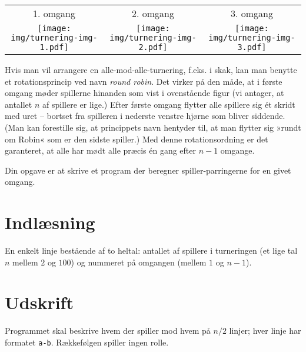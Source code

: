 
\begin{tabular}{ccc}
  1. omgang & 2. omgang & 3. omgang\\[1ex]
  \texttt{[image: img/turnering-img-1.pdf]} &
  \texttt{[image: img/turnering-img-2.pdf]} &
  \texttt{[image: img/turnering-img-3.pdf]} 
\end{tabular}
\bigskip

Hvis man vil arrangere en alle-mod-alle-turnering, f.eks. i skak, kan man benytte et rotationsprincip ved navn \emph{round robin}.
Det virker på den måde, at i første omgang møder spillerne hinanden som vist i ovenstående figur (vi antager, at antallet $n$ af spillere er lige.)
Efter første omgang flytter alle spillere sig ét skridt med uret -- bortset fra spilleren i nederste venstre hjørne som bliver siddende.
(Man kan forestille sig, at princippets navn hentyder til, at man flytter sig »rundt om Robin« som er den sidste spiller.) 
Med denne rotationsordning er det garanteret, at alle har mødt alle præcis én gang efter $n-1$ omgange.

Din opgave er at skrive et program der beregner spiller-parringerne for en givet omgang.

\section*{Indlæsning}
En enkelt linje bestående af to heltal: antallet af spillere i turneringen (et lige tal $n$ mellem $2$ og $100$) og nummeret på omgangen (mellem $1$ og $n-1$).

\section*{Udskrift}

Programmet skal beskrive hvem der spiller mod hvem på $n/2$ linjer; hver linje har formatet \texttt{a-b}.
Rækkefølgen spiller ingen rolle.
